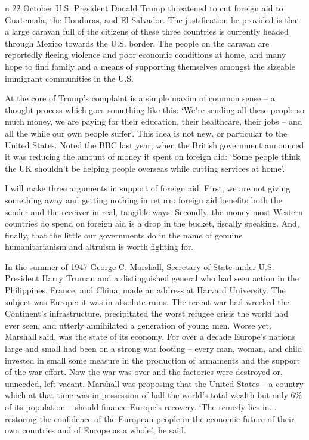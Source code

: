 \label{ch:in-defence-of-giving-foreigners-our-tax-money}

{\flushright{}}

\smallskip

   n 22 October U.S. President Donald Trump threatened to cut foreign aid
   to Guatemala, the Honduras, and El Salvador. The justification he
   provided is that a large caravan full of the citizens of these three
   countries is currently headed through Mexico towards the U.S. border.
   The people on the caravan are reportedly fleeing violence and poor
   economic conditions at home, and many hope to find family and a means
   of supporting themselves amongst the sizeable immigrant communities in
   the U.S.

   At the core of Trump's complaint is a simple maxim of common sense -- a
   thought process which goes something like this: `We're sending all
   these people so much money, we are paying for their education, their
   healthcare, their jobs -- and all the while our own people suffer'.
   This idea is not new, or particular to the United States. Noted the BBC
   last year, when the British government announced it was reducing the
   amount of money it spent on foreign aid: `Some people think the UK
   shouldn't be helping people overseas while cutting services at home'.

   I will make three arguments in support of foreign aid. First, we are
   not giving something away and getting nothing in return: foreign aid
   benefits both the sender and the receiver in real, tangible ways.
   Secondly, the money most Western countries do spend on foreign aid is a
   drop in the bucket, fiscally speaking. And, finally, that the little
   our governments do in the name of genuine humanitarianism and altruism
   is worth fighting for.

   In the summer of 1947 George C. Marshall, Secretary of State under U.S.
   President Harry Truman and a distinguished general who had seen action
   in the Philippines, France, and China, made an address at Harvard
   University. The subject was Europe: it was in absolute ruins. The
   recent war had wrecked the Continent's infrastructure, precipitated the
   worst refugee crisis the world had ever seen, and utterly annihilated a
   generation of young men. Worse yet, Marshall said, was the state of its
   economy. For over a decade Europe's nations large and small had been on
   a strong war footing -- every man, woman, and child invested in small
   some measure in the production of armaments and the support of the war
   effort. Now the war was over and the factories were destroyed or,
   unneeded, left vacant. Marshall was proposing that the United States --
   a country which at that time was in possession of half the world's
   total wealth but only 6\% of its population -- should finance Europe's
   recovery. `The remedy lies in... restoring the confidence of the
   European people in the economic future of their own countries and of
   Europe as a whole', he said.

